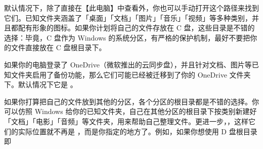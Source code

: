 {{{{默认情况下，\cprotect{}除了直接在【此电脑】中查看外，你也可以手动打开这个路径来找到它们。已知文件夹涵盖了「桌面」「文档」「图片」「音乐」「视频」等多种类别，并且都配有形象的图标。如果你计划将自己的文件存放在 C 盘，这些目录是不错的选择：毕竟，C 盘作为 Windows 的系统分区，有严格的保护机制，最好不要把你的文件直接放在 C 盘根目录下。

\begin{warning}
  如果你的电脑登录了 OneDrive（微软推出的云同步盘），并且针对文档、图片等已知文件夹启用了备份功能，那么它们可能已经被迁移到了你的 OneDrive 文件夹下。默认情况下它是 。
\end{warning}

如果你打算把自己的文件放到其他的分区，各个分区的根目录都是不错的选择。你可以仿照 Windows 给你的已知文件夹，自己在其他分区的根目录下按类别新建好「文档」「电影」「音频」等文件夹，用来帮助自己整理文件。更进一步，，这样它们的实际位置就不再是 ，而是你指定的地方了。例如，如果你想使用 D 盘根目录即 }}}}
